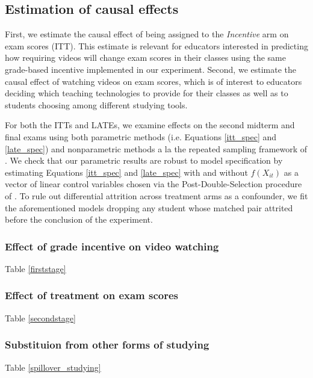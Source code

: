 \documentclass[12pt]{article}
\begin{document}
\subsection{Estimation of causal effects}

First, we estimate the causal effect of being assigned to the \textit{Incentive} arm on exam scores (ITT). This estimate is relevant for educators interested in predicting how requiring videos will change exam scores in their classes using the same grade-based incentive implemented in our experiment. Second, we estimate the causal effect of watching videos on exam scores, which is of interest to educators deciding which teaching technologies to provide for their classes as well as to students choosing among different studying tools.

For both the ITTs and LATEs, we examine effects on the second midterm and final exams using both parametric methods (i.e. Equations \ref{itt_spec} and \ref{late_spec}) and nonparametric methods a la the repeated sampling framework of \textcite{neyman1923}%
. We check that our parametric results are robust to model specification by estimating Equations \ref{itt_spec} and \ref{late_spec} with and without $f(X_{it})$ as a vector of linear control variables chosen via the Post-Double-Selection procedure of \textcite{bch2014a}. To rule out differential attrition across treatment arms as a confounder, we fit the aforementioned models dropping any student whose matched pair attrited before the conclusion of the experiment.

\subsubsection{Effect of grade incentive on video watching}

Table \ref{firststage}

\subsubsection{Effect of treatment on exam scores}

Table \ref{secondstage}

\subsubsection{Substituion from other forms of studying}

Table \ref{spillover_studying}
\end{document}
